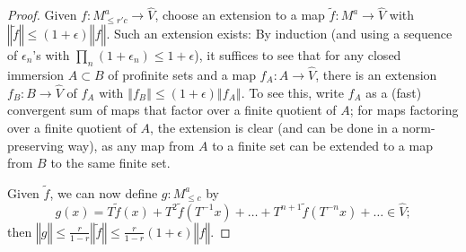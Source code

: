 \begin{proof} Given $f: M_{\leq r'c}^a\to \widehat{V}$, choose an extension to a map $\tilde{f}: M^a\to \widehat{V}$ with $‖\tilde{f}‖\leq (1+\epsilon)‖f‖$. Such an extension exists: By induction (and using a sequence of $\epsilon_n$'s with $\prod_n (1+\epsilon_n)\leq 1+\epsilon$), it suffices to see that for any closed immersion $A\subset B$ of profinite sets and a map $f_A: A\to \widehat{V}$, there is an extension $f_B: B\to \widehat{V}$ of $f_A$ with $‖f_B‖\leq (1+\epsilon)‖f_A‖$. To see this, write $f_A$ as a (fast) convergent sum of maps that factor over a finite quotient of $A$; for maps factoring over a finite quotient of $A$, the extension is clear (and can be done in a norm-preserving way), as any map from $A$ to a finite set can be extended to a map from $B$ to the same finite set.

Given $\tilde{f}$, we can now define $g: M_{\leq c}^a$ by
\[
g(x) = T\tilde{f}(x)+T^2\tilde{f}(T^{-1}x)+\ldots+T^{n+1}\tilde{f}(T^{-n}x)+\ldots\in \widehat{V};
\]
then $‖g‖\leq \frac r{1-r}‖\tilde{f}‖\leq \frac r{1-r}(1+\epsilon)‖f‖$.
\end{proof}

